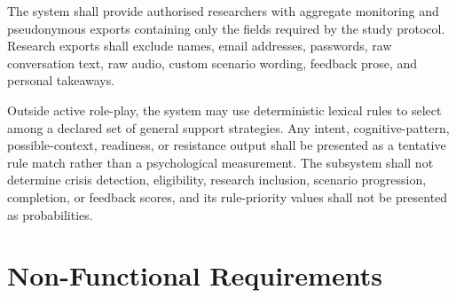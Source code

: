 \begin{description}[leftmargin=!,labelwidth=3.7cm,style=nextline]
    \item[\textbf{FR28. Pseudonymous research access}]
    The system shall provide authorised researchers with aggregate monitoring and pseudonymous exports containing only the fields required by the study protocol. Research exports shall exclude names, email addresses, passwords, raw conversation text, raw audio, custom scenario wording, feedback prose, and personal takeaways.

    \item[\textbf{FR29. Bounded general support routing}]
    Outside active role-play, the system may use deterministic lexical rules to select among a declared set of general support strategies. Any intent, cognitive-pattern, possible-context, readiness, or resistance output shall be presented as a tentative rule match rather than a psychological measurement. The subsystem shall not determine crisis detection, eligibility, research inclusion, scenario progression, completion, or feedback scores, and its rule-priority values shall not be presented as probabilities.
\end{description}

\section{Non-Functional Requirements}

